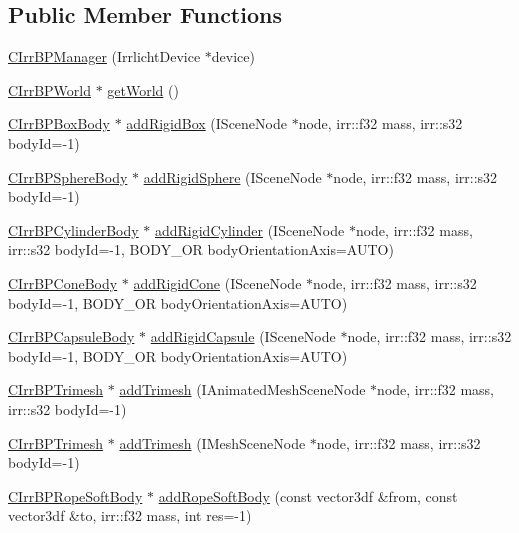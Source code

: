\subsection*{Public Member Functions}
\begin{DoxyCompactItemize}
\item 
\hyperlink{class_c_irr_b_p_manager_ae449dd7e0fa17f986a8ee2b6afe36a09}{CIrrBPManager} (IrrlichtDevice $\ast$device)
\item 
\hyperlink{class_c_irr_b_p_world}{CIrrBPWorld} $\ast$ \hyperlink{class_c_irr_b_p_manager_acdfaf5f8c351d72c4d9680cb75372ae3}{getWorld} ()
\item 
\hyperlink{class_c_irr_b_p_box_body}{CIrrBPBoxBody} $\ast$ \hyperlink{class_c_irr_b_p_manager_a61ed9d76cfe90285f6e7d80b5870406f}{addRigidBox} (ISceneNode $\ast$node, irr::f32 mass, irr::s32 bodyId=-\/1)
\item 
\hyperlink{class_c_irr_b_p_sphere_body}{CIrrBPSphereBody} $\ast$ \hyperlink{class_c_irr_b_p_manager_aebbe19de8a748a7c66d5d0efc16dc5eb}{addRigidSphere} (ISceneNode $\ast$node, irr::f32 mass, irr::s32 bodyId=-\/1)
\item 
\hyperlink{class_c_irr_b_p_cylinder_body}{CIrrBPCylinderBody} $\ast$ \hyperlink{class_c_irr_b_p_manager_a7866f42ff533e69342c9ad370f07aa23}{addRigidCylinder} (ISceneNode $\ast$node, irr::f32 mass, irr::s32 bodyId=-\/1, BODY\_\-OR bodyOrientationAxis=AUTO)
\item 
\hyperlink{class_c_irr_b_p_cone_body}{CIrrBPConeBody} $\ast$ \hyperlink{class_c_irr_b_p_manager_a810377e264480789138dc4b9ac5145d4}{addRigidCone} (ISceneNode $\ast$node, irr::f32 mass, irr::s32 bodyId=-\/1, BODY\_\-OR bodyOrientationAxis=AUTO)
\item 
\hyperlink{class_c_irr_b_p_capsule_body}{CIrrBPCapsuleBody} $\ast$ \hyperlink{class_c_irr_b_p_manager_ac351ba81cf28a33bac69bc348860cd48}{addRigidCapsule} (ISceneNode $\ast$node, irr::f32 mass, irr::s32 bodyId=-\/1, BODY\_\-OR bodyOrientationAxis=AUTO)
\item 
\hyperlink{class_c_irr_b_p_trimesh}{CIrrBPTrimesh} $\ast$ \hyperlink{class_c_irr_b_p_manager_ad565fee43722307839908de9aab70344}{addTrimesh} (IAnimatedMeshSceneNode $\ast$node, irr::f32 mass, irr::s32 bodyId=-\/1)
\item 
\hyperlink{class_c_irr_b_p_trimesh}{CIrrBPTrimesh} $\ast$ \hyperlink{class_c_irr_b_p_manager_a14eef4c19ac93cf7dff82544637833e0}{addTrimesh} (IMeshSceneNode $\ast$node, irr::f32 mass, irr::s32 bodyId=-\/1)
\item 
\hyperlink{class_c_irr_b_p_rope_soft_body}{CIrrBPRopeSoftBody} $\ast$ \hyperlink{class_c_irr_b_p_manager_ae962ff163a13005f463aa51a351a0a87}{addRopeSoftBody} (const vector3df \&from, const vector3df \&to, irr::f32 mass, int res=-\/1)

\end{DoxyCompactItemize}
